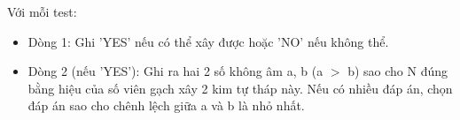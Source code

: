 Với mỗi test:
\begin{itemize}
	\item Dòng 1: Ghi 'YES' nếu có thể xây được hoặc 'NO' nếu không thể.
	\item Dòng 2 (nếu 'YES'): Ghi ra hai 2 số không âm a, b (a $>$ b) sao cho N đúng bằng hiệu của số viên gạch xây 2 kim tự tháp này. Nếu có nhiều đáp án, chọn đáp án sao cho chênh lệch giữa a và b là nhỏ nhất.
\end{itemize}